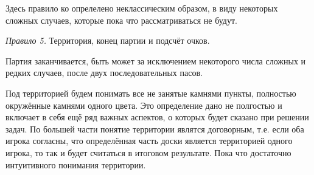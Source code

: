 \documentclass[14pt,a4paper]{extarticle}
\begin{document}
Здесь правило ко опрелелено неклассическим образом, в виду некоторых сложных случаев, которые пока что рассматриваться не будут.

\textit{Правило 5.} Территория, конец партии и подсчёт очков.

Партия заканчивается, быть может за исключением некоторого числа сложных и редких случаев, после двух последовательных пасов.

Под территорией будем понимать все не занятые камнями пункты, полностью окружённые камнями одного цвета. Это определение дано не полгостью и включает в себя ещё ряд важных аспектов, о которых будет сказано при решении задач. По большей части понятие территории являтся договорным, т.е. если оба игрока согласны, что определённая часть доски является территорией одного игрока, то так и будет считаться в итоговом результате. Пока что достаточно интуитивного понимания территории.
\end{document}
